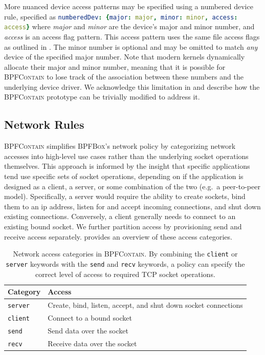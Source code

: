 \documentclass[
  fontsize=12pt,
  titlepage=firstiscover,
  paper=letter,
oneside,
  cleardoublepage=plain,
  parskip=half-,
  DIV=10,
  parindent,
  appendixprefix,
  chapterprefix,
  listof=totoc,
]{scrbook}
\newcommand{\bpfbox}{\textsc{BPFBox}}
\newcommand{\bpfcontain}{\textsc{BPFContain}}
\begin{document}
More nuanced device access patterns may be specified using a numbered device rule,
specified as \lstinline[language=yaml]|numberedDev: {major: major, minor: minor, access: access}|
where \textit{major} and \textit{minor} are the device's major and minor number,
and \textit{access} is an access flag pattern. This access pattern uses the same file
access flags as outlined in . The minor number is
optional and may be omitted to match \textit{any} device of the specified major number.
Note that modern kernels dynamically allocate their major and minor number, meaning that
it is possible for \bpfcontain{} to lose track of the association between these numbers
and the underlying device driver.  We acknowledge this limitation in
 and describe how the \bpfcontain{} prototype can be trivially
modified to address it.

\subsection{Network Rules}

\bpfcontain{} simplifies \bpfbox{}'s network policy by categorizing network accesses into
high-level use cases rather than the underlying socket operations themselves. This
approach is informed by the insight that specific applications tend use specific sets of
socket operations, depending on if the application is designed as a client, a server, or
some combination of the two (e.g.\ a peer-to-peer model). Specifically, a server would
require the ability to create sockets, bind them to an \gls{ip} address, listen for and
accept incoming connections, and shut down existing connections. Conversely, a client
generally needs to connect to an existing bound socket. We further partition access by
provisioning send and receive access separately.  provides an
overview of these access categories.

\begin{table}[htpb]
  \centering
  \caption[Network access categories in \bpfcontain{}]{
    Network access categories in \bpfcontain{}. By combining the \texttt{client} or
    \texttt{server} keywords with the \texttt{send} and \texttt{recv} keywords, a policy
    can specify the correct level of access to required TCP socket operations.
  }\label{tab:bpfcontain-network}
  \begin{tabular}{ll}
  \toprule
  Category & Access \\
  \midrule
  \texttt{server} & Create, bind, listen, accept, and shut down socket connections \\
  \texttt{client} & Connect to a bound socket \\
  \texttt{send} & Send data over the socket \\
  \texttt{recv} & Receive data over the socket \\
  \bottomrule
  \end{tabular}
\end{table}
\end{document}
